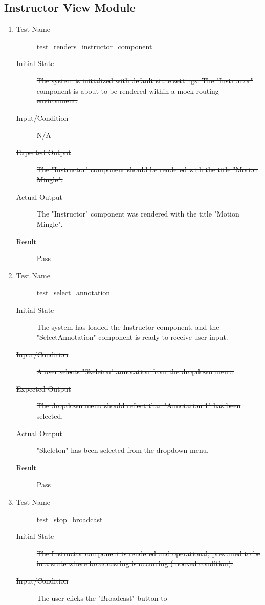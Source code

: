 \documentclass[12pt, titlepage]{article}
\begin{document}
\subsection{Instructor View Module}
\begin{enumerate}[UT-M1]
\item \label{UT-M1}
  \begin{description}
  \item[Test Name] test\_renders\_instructor\_component
  \item[\sout{Initial State}] \sout{The system is initialized with default state
      settings. The "Instructor" component is about to be rendered within a mock
      routing environment.}
  \item[\sout{Input/Condition}] \sout{N/A}
  \item[\sout{Expected Output}] \sout{The "Instructor" component should be rendered
      with the title "Motion Mingle".}
  \item[Actual Output] The "Instructor" component was rendered with the title
    "Motion Mingle".
  \item[Result] Pass
  \end{description}
\item \label{UT-M2}
  \begin{description}
  \item[Test Name] test\_select\_annotation
  \item[\sout{Initial State}] \sout{The system has loaded the Instructor component,
      and the "SelectAnnotation" component is ready to receive user input.}
  \item[\sout{Input/Condition}] \sout{A user selects "Skeleton" annotation from the
      dropdown menu.}
  \item[\sout{Expected Output}] \sout{The dropdown menu should reflect that
      "Annotation 1" has been selected.}
  \item[Actual Output] "Skeleton" has been selected from the dropdown menu.
  \item[Result] Pass
  \end{description}
\item \label{UT-M3}
  \begin{description}
  \item[Test Name] test\_stop\_broadcast
  \item[\sout{Initial State}] \sout{The Instructor component is rendered and
      operational, presumed to be in a state where broadcasting is occurring
      (mocked condition).}
  \item[\sout{Input/Condition}] \sout{The user clicks the "Broadcast" button to
}
\end{description}
\end{enumerate}
\end{document}
